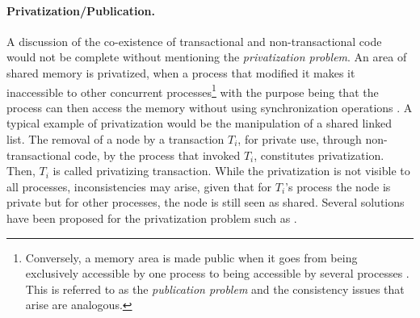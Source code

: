 \paragraph{Privatization/Publication.}
A discussion of the co-existence of transactional and non-transactional code 
would not be complete without mentioning the
{\it privatization problem}. An area of shared memory is privatized,  
when a process  that modified it makes it  inaccessible to other concurrent
processes\footnote{Conversely, a memory area is made public  
when it goes from being exclusively accessible by one process to being 
accessible by several processes \cite{spear08} . 
This is referred  to as the {\it publication problem} and the consistency 
issues that arise are analogous.} with the purpose being
that the process can then access
the memory without using synchronization operations \cite{spear07}.  
A typical  example of privatization would  be the manipulation  of a shared
linked list. The  removal of a node by a  transaction $T_i$, for private
use, through  non-transactional  code,  by  the process  that  invoked $T_i$,  
constitutes  privatization. Then, $T_i$  is called privatizing transaction. 
While the privatization is not visible to all processes, inconsistencies may arise, given 
that for $T_i${}'s process the node is private but for other processes, the node is 
still seen as shared. 
Several solutions have been proposed for the privatization problem 
such as \cite{scott07,afek10,dice10}. %
